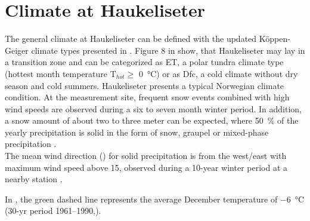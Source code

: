 %
%
%
\section{Climate at Haukeliseter}\label{sec:dim:dec_obs}
The general climate at Haukeliseter can be defined with the updated K\"oppen-Geiger climate types presented in \citet{peel_updated_2007}. Figure 8 in \citet{peel_updated_2007} show, that Haukeliseter may lay in a transition zone and can be categorized as ET, a polar tundra climate type (hottest month temperature T$_{hot}\ge$ \SI{0}{\celsius}) or as Dfc, a cold climate without dry season and cold summers. 
% 
Haukeliseter presents a typical Norwegian climate condition. At the measurement site, frequent snow events combined with high wind speeds are observed during a six to seven month winter period. In addition, a snow amount of about two to three meter can be expected, where \SI{50}{\percent} of the yearly precipitation is solid in the form of snow, graupel or mixed-phase precipitation \citep{wolff_new_2010, wolff_measurements_2013, wolff_derivation_2015}. \\
The mean wind direction () for solid precipitation is from the west/east with maximum wind speed above \SI{15}{\mPs}, observed during a 10-year winter period at a nearby station \citep{wolff_new_2010, wolff_derivation_2015}. 

In , the green dashed line represents the average December temperature of \SI{-6}{\celsius} (30-yr period \numrange{1961}{1990},\citep{eklima_norwegian_2016}).
